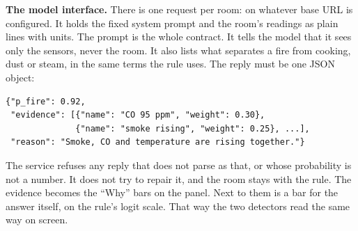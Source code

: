 \textbf{The model interface.} There is one request per room:
 on whatever base URL is configured. It holds the fixed
system prompt and the room's readings as plain lines with units. The prompt is the
whole contract. It tells the model that it sees only the sensors, never the room. It
also lists what separates a fire from cooking, dust or steam, in the same terms the
rule uses. The reply must be one JSON object:

\begin{verbatim}
{"p_fire": 0.92,
 "evidence": [{"name": "CO 95 ppm", "weight": 0.30},
              {"name": "smoke rising", "weight": 0.25}, ...],
 "reason": "Smoke, CO and temperature are rising together."}
\end{verbatim}

The service refuses any reply that does not parse as that, or whose probability is
not a number. It does not try to repair it, and the room stays with the rule. The
evidence becomes the ``Why'' bars on the panel. Next to them is a bar for the answer
itself, on the rule's logit scale. That way the two detectors read the same way on
screen.
